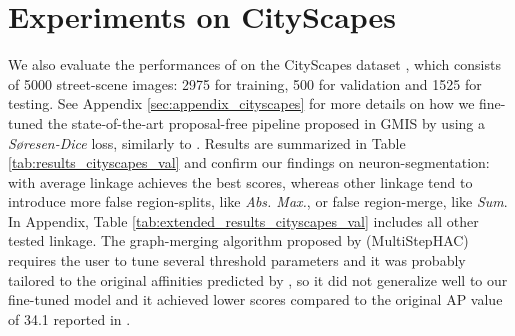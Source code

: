 \section{Experiments on CityScapes}\label{sec:cityscapes_exp}
We also evaluate the performances of \algname{} on the CityScapes dataset \cite{cordts2016cityscapes}, which consists of 5000 street-scene images: 2975 for training, 500 for validation and 1525 for testing.
See Appendix \ref{sec:appendix_cityscapes} for more details on how we fine-tuned the state-of-the-art proposal-free pipeline proposed in GMIS \cite{liu2018affinity} by using a \emph{S\o resen-Dice} loss, similarly to \cite{wolf2018mutex}.
Results are summarized in Table \ref{tab:results_cityscapes_val} and confirm our findings on neuron-segmentation: \algname{} with average linkage achieves the best scores, whereas other linkage tend to introduce more false region-splits, like \emph{Abs. Max.}, or false region-merge, like \emph{Sum}. In Appendix, Table \ref{tab:extended_results_cityscapes_val} includes all other tested linkage. The graph-merging algorithm proposed by \cite{liu2018affinity} (MultiStepHAC) requires the user to tune several threshold parameters and it was probably tailored to the original affinities predicted by \cite{liu2018affinity}, so it did not generalize well to our fine-tuned model and it achieved lower scores compared to the original AP value of 34.1 reported in \cite{liu2018affinity}.  
